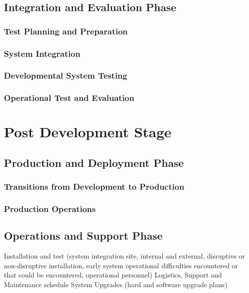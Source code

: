 \documentclass[a4paper,11pt,fleqn]{report}
\begin{document}
\section{Integration and Evaluation Phase}

\subsection{Test Planning and Preparation}

\subsection{System Integration}

\subsection{Developmental System Testing}

\subsection{Operational Test and Evaluation}

\chapter{Post Development Stage}

\section{Production and Deployment Phase}

\subsection{Transitions from Development to Production}

\subsection{Production Operations}

\section{Operations and Support Phase}
Installation and test (system integration site, internal and external, disruptive or non-disruptive installation, early system operational difficulties encountered or that could be encountered, operational personnel)
Logistics, Support and Maintenance schedule
System Upgrades (hard and software upgrade plans)
\end{document}
